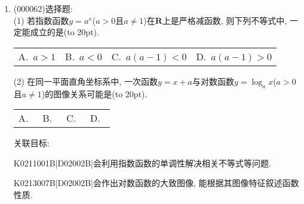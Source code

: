 \documentclass[10pt,a4paper]{article}
\newcommand{\bracket}[1]{(\hbox to #1pt{})}
\newcommand{\fourch}[4]{\par\begin{tabular}{p{.23\textwidth}p{.23\textwidth}p{.23\textwidth}p{.23\textwidth}}
A.~#1 &B.~#2& C.~#3& D.~#4
\end{tabular}}
\begin{document}
\begin{enumerate}[1.]

\item { (000062)}选择题:\\
(1) 若指数函数$y=a^x$($a>0$且$a\ne 1$)在$\mathbf{R}$上是严格减函数, 则下列不等式中, 一定能成立的是\bracket{20}.
\fourch{$a>1$}{$a<0$}{$a(a-1)<0$}{$a(a-1)>0$}
(2) 在同一平面直角坐标系中, 一次函数$y=x+a$与对数函数$y=\log_ax$($a>0$且$a\ne 1$)的图像关系可能是\bracket{20}.
\fourch{\begin{tikzpicture}[scale = 0.5,>=latex]
    \draw [->] (-2,0) -- (3,0) node [below] {$x$};
    \draw [->] (0,-2) -- (0,3) node [left] {$y$};
    \draw (0,0) node [below left] {$O$};
    \draw (0.1,1) -- (0,1) node [left] {$1$};
    \draw (1,0) node [below] {$1$};
    \draw [thick] (-2,-0.3) -- (1.3,3);
    \draw [thick,domain =-1.1:2.1,samples = 200] plot ({0.5^\x},\x);
\end{tikzpicture}
}{\begin{tikzpicture}[scale = 0.5,>=latex]
    \draw [->] (-2,0) -- (3,0) node [below] {$x$};
    \draw [->] (0,-2) -- (0,3) node [left] {$y$};
    \draw (0,0) node [below left] {$O$};
    \draw (0.1,1) -- (0,1) node [left] {$1$};
    \draw (1,0) node [below] {$1$};
    \draw [thick] (-2,-1.5) -- (2.5,3);
    \draw [thick,domain =1.5:-1.5,samples = 200] plot ({0.5^\x},-\x);
\end{tikzpicture}
}{\begin{tikzpicture}[scale = 0.5,>=latex]
    \draw [->] (-2,0) -- (3,0) node [below] {$x$};
    \draw [->] (0,-2) -- (0,3) node [left] {$y$};
    \draw (0,0) node [below left] {$O$};
    \draw (0.1,1) -- (0,1) node [left] {$1$};
    \draw (1,0) node [below] {$1$};
    \draw [thick] (-2,-1.5) -- (2.5,3);
    \draw [thick,domain =-1.1:2.1,samples = 200] plot ({0.5^\x},\x);
\end{tikzpicture}
}{\begin{tikzpicture}[scale = 0.5,>=latex]
    \draw [->] (-2,0) -- (3,0) node [below] {$x$};
    \draw [->] (0,-2) -- (0,3) node [left] {$y$};
    \draw (0,0) node [below left] {$O$};
    \draw (0.1,1) -- (0,1) node [left] {$1$};
    \draw (1,0) node [below] {$1$};
    \draw [thick] (-1.5,-2) -- (3,2.5);
    \draw [thick,domain =1.5:-1.5,samples = 200] plot ({0.5^\x},-\x);
\end{tikzpicture}
}


关联目标:

K0211001B|D02002B|会利用指数函数的单调性解决相关不等式等问题.

K0213007B|D02002B|会作出对数函数的大致图像, 能根据其图像特征叙述函数性质.




\end{enumerate}
\end{document}
